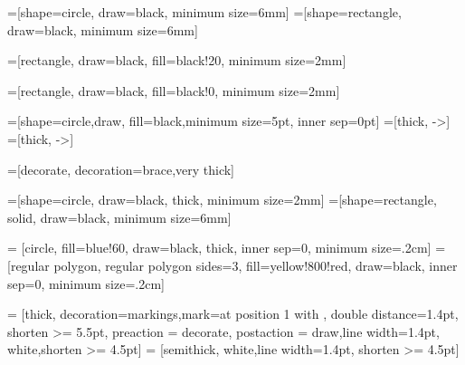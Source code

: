 \usepackage{tikz}
\usepackage{pgf}
\usetikzlibrary{positioning}
\usetikzlibrary{shadows,shapes,arrows}
\usetikzlibrary{calc,3d}
\usetikzlibrary{fit}
\usetikzlibrary{decorations.pathmorphing}
\usetikzlibrary{trees} 

=[shape=circle, draw=black, minimum size=6mm]
=[shape=rectangle, draw=black, minimum size=6mm]

=[rectangle, draw=black, fill=black!20, minimum size=2mm]

=[rectangle, draw=black, fill=black!0, minimum size=2mm]

=[shape=circle,draw, fill=black,minimum size=5pt, inner sep=0pt]
=[thick, ->]
=[thick, ->]

=[decorate, decoration=brace,very thick] %

=[shape=circle, draw=black, thick, minimum size=2mm]
=[shape=rectangle, solid, draw=black, minimum size=6mm]

 = [circle, fill=blue!60, draw=black, thick, inner sep=0, minimum size=.2cm]
 = [regular polygon, regular polygon sides=3, fill=yellow!800!red, draw=black, inner sep=0, minimum size=.2cm]

 = [thick, decoration={markings,mark=at position
   1 with {}},
   double distance=1.4pt, shorten >= 5.5pt,
   preaction = {decorate},
   postaction = {draw,line width=1.4pt, white,shorten >= 4.5pt}]
 = [semithick, white,line width=1.4pt, shorten >= 4.5pt]


